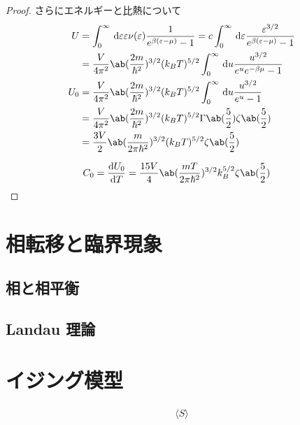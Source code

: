 \documentclass[a4paper,11pt]{jlreq}
\begin{document}
\begin{proof}
  さらにエネルギーと比熱について
  \begin{align}
    U   & = \int_{0}^{\infty}\dl{\varepsilon}\varepsilon\nu(\varepsilon)\frac{1}{e^{\beta(\varepsilon - \mu)} - 1} = c\int_{0}^{\infty}\dl{\varepsilon}\frac{\varepsilon^{3/2}}{e^{\beta(\varepsilon - \mu)} - 1} \\
        & = \frac{V}{4\pi^2}\ab(\frac{2m}{\hbar^2})^{3/2}(k_BT)^{5/2}\int_{0}^{\infty}\dl{u}\frac{u^{3/2}}{e^ue^{-\beta\mu} - 1}                                                                                  \\
    U_0 & = \frac{V}{4\pi^2}\ab(\frac{2m}{\hbar^2})^{3/2}(k_BT)^{5/2}\int_{0}^{\infty}\dl{u}\frac{u^{3/2}}{e^u - 1}                                                                                               \\
        & = \frac{V}{4\pi^2}\ab(\frac{2m}{\hbar^2})^{3/2}(k_BT)^{5/2}\Gamma\ab(\frac{5}{2})\zeta\ab(\frac{5}{2})                                                                                                  \\
        & = \frac{3V}{2}\ab(\frac{m}{2\pi\hbar^2})^{3/2}(k_BT)^{5/2}\zeta\ab(\frac{5}{2})
  \end{align}

  \begin{align}
    C_0 & = \diff{U_0}{T} = \frac{15V}{4}\ab(\frac{mT}{2\pi\hbar^2})^{3/2}k_B^{5/2}\zeta\ab(\frac{5}{2})
  \end{align}
\end{proof}

\section{相転移と臨界現象}
\subsection{相と相平衡}
\subsection{Landau 理論}

\section{イジング模型}

\begin{align}
  \langle S\rangle
\end{align}
\end{document}
